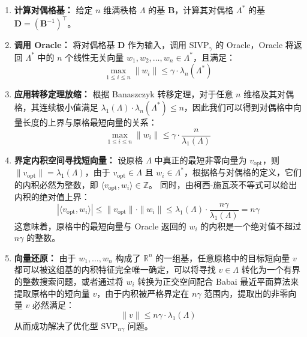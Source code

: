\documentclass{article}
\begin{document}
\begin{enumerate}
    \item \textbf{计算对偶格基：} 给定 $n$ 维满秩格 $\Lambda$ 的基 $\bm{B}$，计算其对偶格 $\Lambda^*$ 的基 $\bm{D} = (\bm{B}^{-1})^\top$。
    
    \item \textbf{调用 Oracle：} 将对偶格基 $\bm{D}$ 作为输入，调用 SIVP$_\gamma$ 的 Oracle，Oracle 将返回 $\Lambda^*$ 中的 $n$ 个线性无关向量 $w_1, w_2, \ldots, w_n \in \Lambda^*$，且满足：
    \[ \max_{1 \leqslant i \leqslant n} \|w_i\| \leqslant \gamma \cdot \lambda_n(\Lambda^*) \]
    
    \item \textbf{应用转移定理放缩：} 根据 Banaszczyk 转移定理，对于任意 $n$ 维格及其对偶格，其连续极小值满足 $\lambda_1(\Lambda) \cdot \lambda_n(\Lambda^*) \leqslant n$，因此我们可以得到对偶格中向量长度的上界与原格最短向量的关系：
    \[ \max_{1 \leqslant i \leqslant n} \|w_i\| \leqslant \gamma \cdot \frac{n}{\lambda_1(\Lambda)} \]
    
    \item \textbf{界定内积空间寻找短向量：} 设原格 $\Lambda$ 中真正的最短非零向量为 $v_{\text{opt}}$，则 $\|v_{\text{opt}}\| = \lambda_1(\Lambda)$，由于 $v_{\text{opt}} \in \Lambda$ 且 $w_i \in \Lambda^*$，根据格与对偶格的定义，它们的内积必然为整数，即 $\langle v_{\text{opt}}, w_i \rangle \in \mathbb{Z}$。
    同时，由柯西-施瓦茨不等式可以给出内积的绝对值上界：
    \[ |\langle v_{\text{opt}}, w_i \rangle| \leqslant \|v_{\text{opt}}\| \cdot \|w_i\| \leqslant \lambda_1(\Lambda) \cdot \dfrac{n\gamma}{\lambda_1(\Lambda)} = n\gamma \]
    这意味着，原格中的最短向量与 Oracle 返回的 $w_i$ 的内积是一个绝对值不超过 $n\gamma$ 的整数。
    
    \item \textbf{向量还原：} 由于 $w_1, \ldots, w_n$ 构成了 $\mathbb{R}^n$ 的一组基，任意原格中的目标短向量 $v$ 都可以被这组基的内积特征完全唯一确定，可以将寻找 $v \in \Lambda$ 转化为一个有界的整数搜索问题，或者通过将 $w_i$ 转换为正交空间配合 Babai 最近平面算法来提取原格中的短向量 $v$，由于内积被严格界定在 $n\gamma$ 范围内，提取出的非零向量 $v$ 必然满足：
    \[ \|v\| \leqslant n\gamma \cdot \lambda_1(\Lambda) \]
    从而成功解决了优化型 SVP$_{n\gamma}$ 问题。
\end{enumerate}
\end{document}
